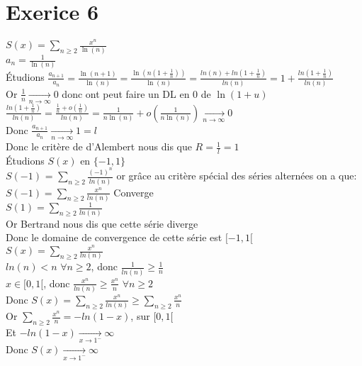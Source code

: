 \documentclass{article}
\author{Frederic Becerril}
\newcommand{\mylim}[2]{\underset{#1 \rightarrow #2}{\longrightarrow}}
\begin{document}
\part*{Exerice 6}

$S(x) = \sum_{n \geq 2} \frac{x^n}{\ln(n)}$\\
$a_n = \frac{1}{\ln(n)}$\\
Étudions $\frac{a_{n+1}}{a_n} = \frac{\ln(n + 1)}{\ln(n)} = \frac{\ln(n(1 + \frac{1}{n}))}{\ln(n)} = \frac{ln(n) + ln(1 + \frac{1}{n})}{ln(n)} = 1 + \frac{ln(1 + \frac{1}{n})}{ln(n)}$\\
Or $\frac{1}{n} \mylim{n}{\infty} 0$ donc ont peut faire un DL en 0 de $\ln(1 + u)$\vspace{2mm}\\
$\frac{ln(1 + \frac{1}{n})}{ln(n)} = \frac{\frac{1}{n} + o(\frac{1}{n})}{ln(n)} = \frac{1}{n\ln(n)} + o\left(\frac{1}{n\ln(n)}\right) \mylim{n}{\infty} 0$\vspace{2mm}\\
Donc $\frac{a_{n + 1}}{a_n} \mylim{n}{\infty} 1 = l$\\
Donc le critère de d'Alembert nous dis que $R = \frac{1}{l} = 1$\\
Étudions $S(x)$ en $\{-1, 1\}$\\
$S(-1)$ = $\sum_{n \geq 2} \frac{(-1)^n}{ln(n)}$ or grâce au critère spécial des séries alternées on a que:\\
$S(-1) = \sum_{n \geq 2} \frac{x^n}{ln(n)}$ Converge\\
$S(1) = \sum_{n \geq 2} \frac{1}{ln(n)}$\\ Or Bertrand nous dis que cette série diverge\\
Donc le domaine de convergence de cette série est $[-1, 1[$\\
$S(x) = \sum_{n \geq 2} \frac{x^n}{ln(n)}$\\
$ln(n) < n$ $\forall n \geq 2$, donc $\frac{1}{ln(n)} \geq \frac{1}{n}$\\
$x \in [0, 1[$, donc $\frac{x^n}{ln(n)} \geq \frac{x^n}{n}$ $\forall n \geq 2$\\
Donc $S(x) = \sum_{n \geq 2} \frac{x^n}{ln(n)} \geq \sum_{n \geq 2} \frac{x^n}{n}$\\
Or $\sum_{n \geq 2} \frac{x^n}{n} = -ln(1 - x)$, sur $[0, 1[$\\
Et $-ln(1 - x) \mylim{x}{1^-} \infty$\\
Donc $S(x) \mylim{x}{1^-} \infty$\\
\newpage
\end{document}
